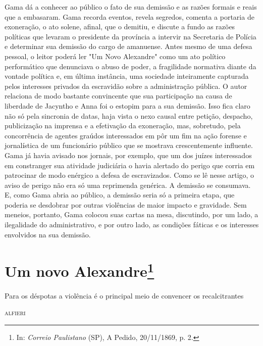 {\small\noindent
Gama dá a conhecer ao público o fato de sua demissão e as razões
formais e reais que a embasaram. Gama recorda eventos, revela segredos,
comenta a portaria de exoneração, o ato solene, afinal, que o demitiu, e
discute a fundo as razões políticas que levaram o presidente da
província a intervir na Secretaria de Polícia e determinar sua demissão
do cargo de amanuense. Antes mesmo de uma defesa pessoal, o leitor
poderá ler "Um Novo Alexandre" como um ato político performático que
denunciava o abuso de poder, a fragilidade normativa diante da vontade
política e, em última instância, uma sociedade inteiramente capturada
pelos interesses privados da escravidão sobre a administração pública. O
autor relaciona de modo bastante convincente que sua participação na
causa de liberdade de Jacyntho e Anna foi o estopim para a sua demissão.
Isso fica claro não só pela sincronia de datas, haja vista o nexo causal
entre petição, despacho, publicização na imprensa e a efetivação da
exoneração, mas, sobretudo, pela concorrência de agentes graúdos
interessados em pôr um fim na ação forense e jornalística de um
funcionário público que se mostrava crescentemente influente. Gama já
havia avisado nos jornais, por exemplo, que um dos juízes interessados
em constranger sua atividade judiciária o havia alertado do perigo que
corria em patrocinar de modo enérgico a defesa de escravizados. Como se
lê nesse artigo, o aviso de perigo não era só uma reprimenda genérica. A
demissão se consumava. E, como Gama abria ao público, a demissão seria
só a primeira etapa, que poderia se desdobrar por outras violências de
maior impacto e gravidade. Sem meneios, portanto, Gama colocou suas
cartas na mesa, discutindo, por um lado, a ilegalidade do
administrativo, e por outro lado, as condições fáticas e os interesses
envolvidos na sua demissão. }

\chapter{Um novo Alexandre\footnote[*]{In: \emph{Correio Paulistano}
  (SP), A Pedido, 20/11/1869, p. 2.}}

\epigraph{Para os déspotas a violência é o principal meio de convencer os
recalcitrantes}{\textsc{alfieri}\footnotemark}


